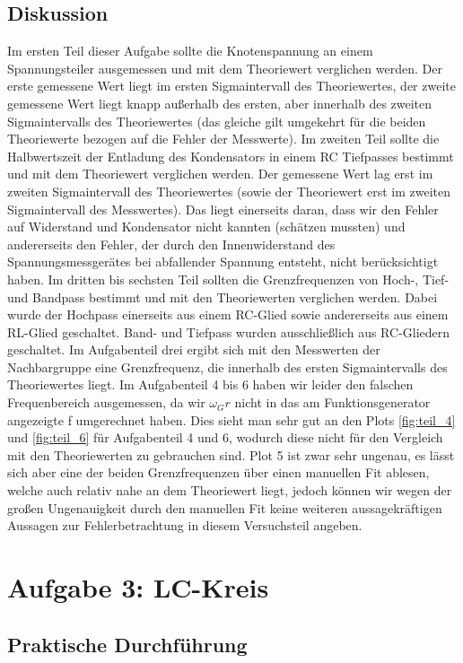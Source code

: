 \documentclass[12pt]{scrartcl}
\begin{document}
\subsection{Diskussion}
Im ersten Teil dieser Aufgabe sollte die Knotenspannung an einem Spannungsteiler ausgemessen und mit dem Theoriewert verglichen werden. Der erste gemessene Wert liegt im ersten Sigmaintervall des Theoriewertes, der zweite gemessene Wert liegt knapp außerhalb des ersten, aber innerhalb des zweiten Sigmaintervalls des Theoriewertes (das gleiche gilt umgekehrt für die beiden Theoriewerte bezogen auf die Fehler der Messwerte). 
Im zweiten Teil sollte die Halbwertszeit der Entladung des Kondensators in einem RC Tiefpasses bestimmt und mit dem Theoriewert verglichen werden. Der gemessene Wert lag erst im zweiten Sigmaintervall des Theoriewertes (sowie der Theoriewert erst im zweiten Sigmaintervall des Messwertes). Das liegt einerseits daran, dass wir den Fehler auf Widerstand und Kondensator nicht kannten (schätzen mussten) und andererseits den Fehler, der durch den Innenwiderstand des Spannungsmessgerätes bei abfallender Spannung entsteht, nicht berücksichtigt haben.
Im dritten bis sechsten Teil sollten die Grenzfrequenzen von Hoch-, Tief- und Bandpass bestimmt und mit den Theoriewerten verglichen werden. Dabei wurde der Hochpass einerseits aus einem RC-Glied sowie andererseits aus einem RL-Glied geschaltet. Band- und Tiefpass wurden ausschließlich aus RC-Gliedern geschaltet. Im Aufgabenteil drei ergibt sich mit den Messwerten der Nachbargruppe eine Grenzfrequenz, die innerhalb des ersten Sigmaintervalls des Theoriewertes liegt.
Im Aufgabenteil 4 bis 6 haben wir leider den falschen Frequenbereich ausgemessen, da wir $\omega_Gr$ nicht in das am Funktionsgenerator angezeigte f umgerechnet haben.
Dies sieht man sehr gut an den Plots
\ref{fig:teil_4} und \ref{fig:teil_6}
für Aufgabenteil 4 und 6, wodurch diese nicht für den Vergleich mit den Theoriewerten zu gebrauchen sind.
Plot 5 ist zwar sehr ungenau, es lässt sich aber eine der beiden Grenzfrequenzen über einen manuellen Fit ablesen, welche auch relativ nahe an dem Theoriewert liegt, jedoch können wir wegen der großen Ungenauigkeit durch den manuellen Fit keine weiteren aussagekräftigen Aussagen zur Fehlerbetrachtung in diesem Versuchsteil angeben.
\section{Aufgabe 3: LC-Kreis}
\subsection{Praktische Durchführung}
\end{document}
